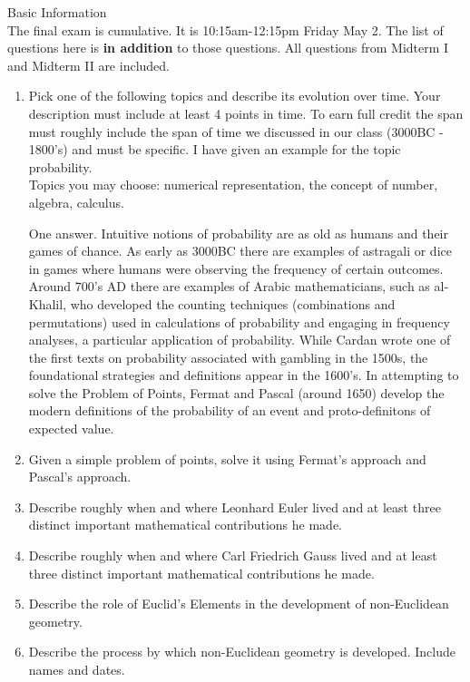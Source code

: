 \documentclass[12pt]{article}
\renewcommand{\emph}[1]{\textsf{\textbf{#1}}}
\begin{document}
\noindent Basic Information\\
The final exam is cumulative. It is 10:15am-12:15pm Friday May 2. The list of questions here is \emph{in addition} to those questions. All questions from Midterm I and Midterm II are included.  \\

\begin{enumerate}
\item Pick one of the following topics and describe its evolution over time. Your description must include at least 4 points in time. To earn full credit the span must roughly include the span of time we discussed in our class (3000BC - 1800's) and must be specific. I have given an example for the topic probability.\\
Topics you may choose: numerical representation, the concept of number, algebra, calculus.

One answer.
Intuitive notions of probability are as old as humans and their games of chance. As early as 3000BC there are examples of astragali or dice in games where humans were observing the frequency of certain outcomes. Around 700's AD there are examples of Arabic mathematicians, such as al-Khalil, who developed the counting techniques (combinations and permutations) used in calculations of probability and engaging in frequency analyses, a particular application of probability. While Cardan wrote one of the first texts on probability associated with gambling in the 1500s, the foundational strategies and definitions appear in the 1600's. In attempting to solve the Problem of Points, Fermat and Pascal (around 1650) develop the modern definitions of the probability of an event and proto-definitons of expected value.

\item Given a simple problem of points, solve it using Fermat's approach and Pascal's approach.

\item Describe roughly when and where Leonhard Euler lived and at least three distinct important mathematical contributions he made.

\item Describe roughly when and where Carl Friedrich Gauss lived and at least three distinct important mathematical contributions he made. 

\item Describe the role of Euclid's Elements in the development of non-Euclidean geometry. 

\item Describe the process by which non-Euclidean geometry is developed. Include names and dates.


\end{enumerate}
\end{document}
